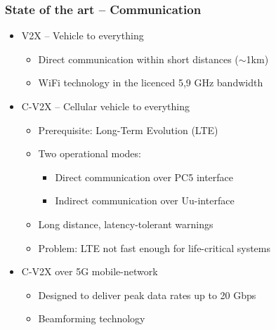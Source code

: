 \documentclass{beamer}
\begin{document}
\begin{frame}
    \frametitle{State of the art -- Communication}
    \begin{itemize}
        \item V2X -- Vehicle to everything
            \begin{itemize}
                \item Direct communication within short distances ($\sim$1km)
                \item WiFi technology in the licenced 5,9 GHz bandwidth
            \end{itemize}
        \item C-V2X -- Cellular vehicle to everything
            \begin{itemize}
                \item Prerequisite: Long-Term Evolution (LTE)
                \item Two operational modes:
                    \begin{itemize}
                        \item Direct communication over PC5 interface
                        \item Indirect communication over Uu-interface
                    \end{itemize}
                \item Long distance, latency-tolerant warnings
                \item Problem: LTE not fast enough for life-critical systems
            \end{itemize}
        \item C-V2X over 5G mobile-network
            \begin{itemize}
                \item Designed to deliver peak data rates up to 20 Gbps
                \item Beamforming technology
            \end{itemize}
    \end{itemize}
\end{frame}
\end{document}
